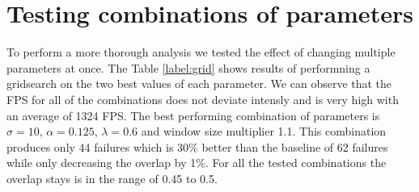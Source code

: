 \documentclass[9pt]{IEEEtran}
\begin{document}
\section{Testing combinations of parameters}
To perform a more thorough analysis we tested the effect of changing multiple parameters at once.
The Table \ref*{label:grid} shows results of performning a gridsearch on the two best values of each parameter.
We can observe that the FPS for all of the combinations does not deviate intensly and is very high with an average of 1324 FPS.
The best performing combination of parameters is $\sigma = 10$, $\alpha = 0.125$, $\lambda = 0.6$ and window size multiplier 1.1.
This combination produces only 44 failures which is 30\% better than the baseline of 62 failures while only decreasing the overlap by 1\%.
For all the tested combinations the overlap stays is in the range of 0.45 to 0.5.
\end{document}
